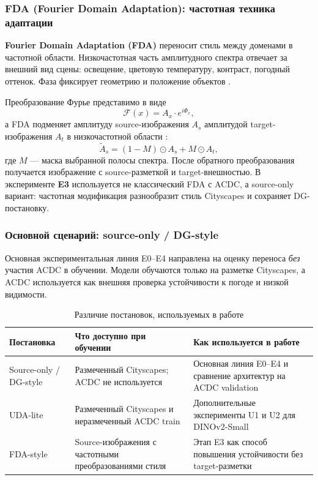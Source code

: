\documentclass[14pt,a4paper]{extarticle}
\begin{document}
\subsubsection{FDA (Fourier Domain Adaptation): частотная техника адаптации}

\textbf{Fourier Domain Adaptation (FDA)} \cite{yang2020fda} переносит стиль между доменами в частотной области. Низкочастотная часть амплитудного спектра отвечает за внешний вид сцены: освещение, цветовую температуру, контраст, погодный оттенок. Фаза фиксирует геометрию и положение объектов \cite{yang2020fda}.

Преобразование Фурье представимо в виде
\begin{equation}
    \mathcal{F}(x) = A_x \cdot e^{i\Phi_x},
\end{equation}
а FDA подменяет амплитуду source-изображения $A_s$ амплитудой target-изображения $A_t$ в низкочастотной области \cite{yang2020fda}:
\begin{equation}
    \tilde{A}_s = (1 - M) \odot A_s + M \odot A_t,
\end{equation}
где $M$ --- маска выбранной полосы спектра. После обратного преобразования получается изображение с source-разметкой и target-внешностью. В эксперименте \textbf{E3} используется не классический FDA с ACDC, а source-only вариант: частотная модификация разнообразит стиль Cityscapes и сохраняет DG-постановку.

\subsubsection{Основной сценарий: source-only / DG-style}

Основная экспериментальная линия E0--E4 направлена на оценку переноса \textit{без} участия ACDC в обучении. Модели обучаются только на разметке Cityscapes, а ACDC используется как внешняя проверка устойчивости к погоде и низкой видимости.

\begin{table}[H]
    \centering
    \caption{Различие постановок, используемых в работе}
    \label{tab:domain_shift_modes}
    \begin{tabularx}{\textwidth}{p{2.6cm}X X}
        \toprule
        Постановка & Что доступно при обучении & Как используется в работе \\
        \midrule
        Source-only / DG-style & Размеченный Cityscapes; ACDC не используется & Основная линия E0--E4 и сравнение архитектур на ACDC validation \\
        UDA-lite & Размеченный Cityscapes и неразмеченный ACDC train & Дополнительные эксперименты U1 и U2 для DINOv2-Small \\
        FDA-style & Source-изображения с частотными преобразованиями стиля & Этап E3 как способ повышения устойчивости без target-разметки \\
        \bottomrule
    \end{tabularx}
\end{table}
\end{document}
